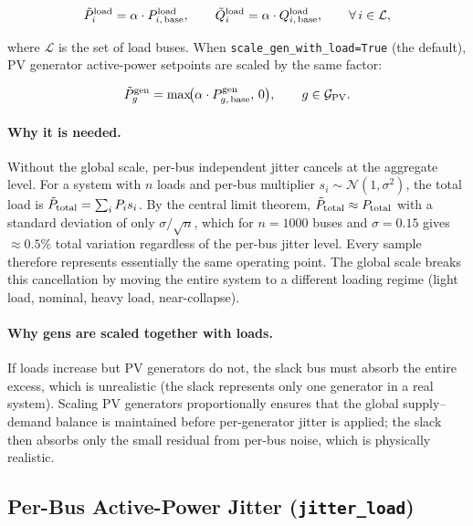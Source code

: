 \documentclass{article}
\begin{document}
\begin{equation}
  \tilde{P}^{\rm load}_{i} = \alpha \cdot P^{\rm load}_{i,\,\rm base},
  \qquad
  \tilde{Q}^{\rm load}_{i} = \alpha \cdot Q^{\rm load}_{i,\,\rm base},
  \qquad \forall\, i \in \mathcal{L},
  \label{eq:global_scale}
\end{equation}

where $\mathcal{L}$ is the set of load buses.  When
\texttt{scale\_gen\_with\_load=True} (the default), PV generator
active-power setpoints are scaled by the same factor:

\begin{equation}
  \tilde{P}^{\rm gen}_{g} = \max\!\bigl(\alpha \cdot P^{\rm gen}_{g,\,\rm base},\, 0\bigr),
  \qquad g \in \mathcal{G}_{\rm PV}.
  \label{eq:global_scale_gen}
\end{equation}

\paragraph{Why it is needed.}
Without the global scale, per-bus independent jitter cancels at the aggregate
level.  For a system with $n$ loads and per-bus multiplier
$s_i \sim \mathcal{N}(1, \sigma^2)$, the total load is
$\tilde{P}_{\rm total} = \sum_i P_i s_i$.  By the central limit theorem,
$\tilde{P}_{\rm total} \approx P_{\rm total}$ with a standard deviation of
only $\sigma / \sqrt{n}$, which for $n = 1000$ buses and $\sigma = 0.15$
gives $\approx 0.5\%$ total variation regardless of the per-bus jitter level.
Every sample therefore represents essentially the same operating point.
The global scale breaks this cancellation by moving the entire system to a
different loading regime (light load, nominal, heavy load, near-collapse).

\paragraph{Why gens are scaled together with loads.}
If loads increase but PV generators do not, the slack bus must absorb the
entire excess, which is unrealistic (the slack represents only one generator
in a real system).  Scaling PV generators proportionally ensures that the
global supply--demand balance is maintained before per-generator jitter is
applied; the slack then absorbs only the small residual from per-bus noise,
which is physically realistic.

\subsection{Per-Bus Active-Power Jitter (\texttt{jitter\_load})}
\end{document}
